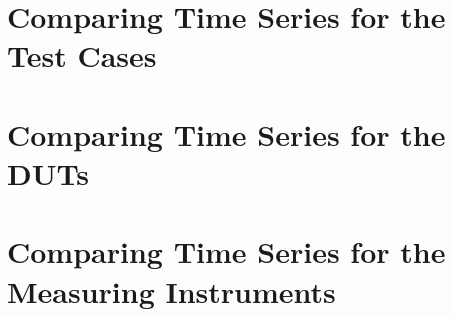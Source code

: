 
\section{Comparing Time Series for the Test Cases}



\section{Comparing Time Series for the DUTs}



\section{Comparing Time Series for the Measuring Instruments}


